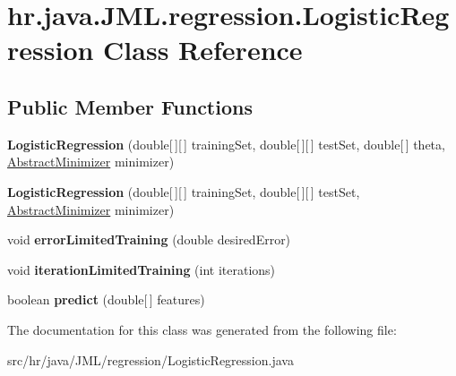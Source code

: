 \hypertarget{classhr_1_1java_1_1_j_m_l_1_1regression_1_1_logistic_regression}{\section{hr.\+java.\+J\+M\+L.\+regression.\+Logistic\+Regression Class Reference}
\label{classhr_1_1java_1_1_j_m_l_1_1regression_1_1_logistic_regression}
}
\subsection*{Public Member Functions}
\begin{DoxyCompactItemize}
\item 
\hypertarget{classhr_1_1java_1_1_j_m_l_1_1regression_1_1_logistic_regression_a29f051a57e0a4036fc419b5259ea6104}{{\bfseries Logistic\+Regression} (double\mbox{[}$\,$\mbox{]}\mbox{[}$\,$\mbox{]} training\+Set, double\mbox{[}$\,$\mbox{]}\mbox{[}$\,$\mbox{]} test\+Set, double\mbox{[}$\,$\mbox{]} theta, \hyperlink{classhr_1_1java_1_1_j_m_l_1_1learning_1_1_abstract_minimizer}{Abstract\+Minimizer} minimizer)}\label{classhr_1_1java_1_1_j_m_l_1_1regression_1_1_logistic_regression_a29f051a57e0a4036fc419b5259ea6104}

\item 
\hypertarget{classhr_1_1java_1_1_j_m_l_1_1regression_1_1_logistic_regression_a76653101d8e522d5d4c62094f64461b4}{{\bfseries Logistic\+Regression} (double\mbox{[}$\,$\mbox{]}\mbox{[}$\,$\mbox{]} training\+Set, double\mbox{[}$\,$\mbox{]}\mbox{[}$\,$\mbox{]} test\+Set, \hyperlink{classhr_1_1java_1_1_j_m_l_1_1learning_1_1_abstract_minimizer}{Abstract\+Minimizer} minimizer)}\label{classhr_1_1java_1_1_j_m_l_1_1regression_1_1_logistic_regression_a76653101d8e522d5d4c62094f64461b4}

\item 
\hypertarget{classhr_1_1java_1_1_j_m_l_1_1regression_1_1_logistic_regression_a70e6206c71b5e1a0061e950c72bf31d1}{void {\bfseries error\+Limited\+Training} (double desired\+Error)}\label{classhr_1_1java_1_1_j_m_l_1_1regression_1_1_logistic_regression_a70e6206c71b5e1a0061e950c72bf31d1}

\item 
\hypertarget{classhr_1_1java_1_1_j_m_l_1_1regression_1_1_logistic_regression_a670489f1591d5ea02aba64abf2cd0b0d}{void {\bfseries iteration\+Limited\+Training} (int iterations)}\label{classhr_1_1java_1_1_j_m_l_1_1regression_1_1_logistic_regression_a670489f1591d5ea02aba64abf2cd0b0d}

\item 
\hypertarget{classhr_1_1java_1_1_j_m_l_1_1regression_1_1_logistic_regression_a8b5552490cefdd032f9d0a4baeb87051}{boolean {\bfseries predict} (double\mbox{[}$\,$\mbox{]} features)}\label{classhr_1_1java_1_1_j_m_l_1_1regression_1_1_logistic_regression_a8b5552490cefdd032f9d0a4baeb87051}

\end{DoxyCompactItemize}


The documentation for this class was generated from the following file\+:\begin{DoxyCompactItemize}
\item 
src/hr/java/\+J\+M\+L/regression/Logistic\+Regression.\+java\end{DoxyCompactItemize}
